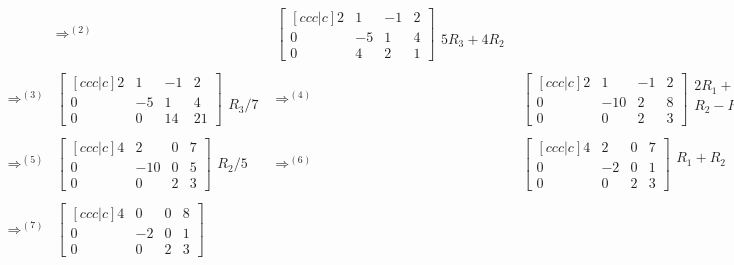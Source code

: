 \begin{example}
$$\begin{array}{rlcl}
&\Rightarrow^{(2)}& 
\begin{bmatrix}[ccc|c] 2&1&-1&2\\0&-5&1&4\\0&4&2&1\end{bmatrix} 
\begin{array}{lr}\ \\ \ \\5R_3+4R_2 \end{array}
\\ \\ \Rightarrow^{(3)}&
 \begin{bmatrix}[ccc|c] 2&1&-1&2\\0&-5&1&4\\0&0&14&21\end{bmatrix} 
 \begin{array}{lr}\ \\ \ \\R_3/7 \end{array}
&\Rightarrow^{(4)}& 
\begin{bmatrix}[ccc|c] 2&1&-1&2\\0&-10&2&8\\0&0&2&3\end{bmatrix} 
\begin{array}{l} 2R_1+R_3\\R_2-R_3\\ \ \end{array}
\\ \\ \Rightarrow^{(5)}&
 \begin{bmatrix}[ccc|c] 4&2&0&7\\0&-10&0&5\\0&0&2&3\end{bmatrix}  
 \begin{array}{lr}\ \\R_2/5\\ \ \end{array} 
&\Rightarrow^{(6)}& 
\begin{bmatrix}[ccc|c] 4&2&0&7\\0&-2&0&1\\0&0&2&3\end{bmatrix}  
\begin{array}{lr} R_1+R_2\\ \ \\ \ \end{array}
\\ \\ \Rightarrow^{(7)}&
\begin{bmatrix}[ccc|c] 4&0&0&8\\0&-2&0&1\\0&0&2&3\end{bmatrix} 

\end{array}$$
\end{example}
